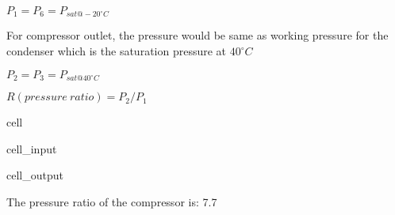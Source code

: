 \documentclass[letterpaper,10pt,english]{jupyterBook}
\begin{document}
\sphinxAtStartPar
\(P_1 = P_6 = P_{sat@-20^{\circ} C}\)

\sphinxAtStartPar
For compressor outlet, the pressure would be same as working pressure for the condenser which is the saturation pressure at \(40^{\circ} C\)

\sphinxAtStartPar
\(P_2 = P_3 = P_{sat@40^{\circ} C}\)

\sphinxAtStartPar
\(R(pressure\:ratio)=P_2/P_1\)

\begin{sphinxuseclass}{cell}\begin{sphinxVerbatimInput}

\begin{sphinxuseclass}{cell_input}
\begin{sphinxVerbatim}[commandchars=\\\{\}]
         
  

         
  

       
 
\end{sphinxVerbatim}

\end{sphinxuseclass}\end{sphinxVerbatimInput}
\begin{sphinxVerbatimOutput}

\begin{sphinxuseclass}{cell_output}
\begin{sphinxVerbatim}[commandchars=\\\{\}]
The pressure ratio of the compressor is: 7.7
\end{sphinxVerbatim}

\end{sphinxuseclass}\end{sphinxVerbatimOutput}

\end{sphinxuseclass}
\end{document}
